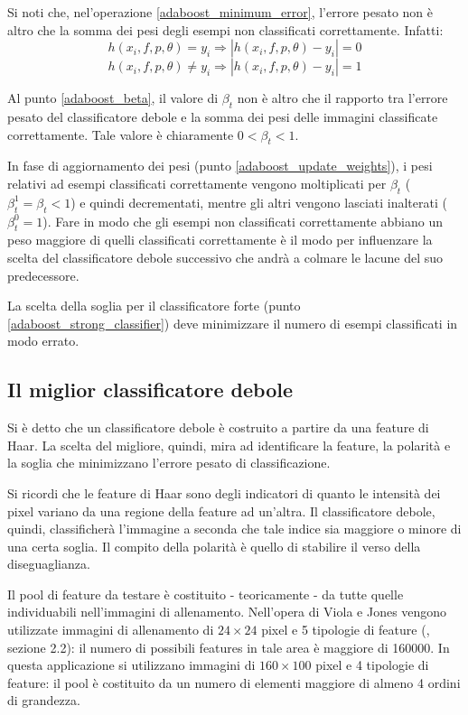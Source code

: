 \documentclass[a4paper,11pt,oneside]{article}
\begin{document}
			Si noti che, nel'operazione \ref{adaboost_minimum_error}, l'errore pesato non è altro che la somma dei pesi degli esempi non classificati correttamente. Infatti:
			$$ h(x_i, f, p, \theta) = y_i \Rightarrow |h(x_i, f, p, \theta) - y_i| = 0 $$
			$$ h(x_i, f, p, \theta) \neq y_i \Rightarrow |h(x_i, f, p, \theta) - y_i| = 1 $$

			Al punto \ref{adaboost_beta}, il valore di $\beta_t$ non è altro che il rapporto tra l'errore pesato del classificatore debole e la somma dei pesi delle immagini classificate correttamente. Tale valore è chiaramente $0 < \beta_t < 1$.

			In fase di aggiornamento dei pesi (punto \ref{adaboost_update_weights}), i pesi relativi ad esempi classificati correttamente vengono moltiplicati per $\beta_t$ ($\beta_{t}^{1} = \beta_t < 1$) e quindi decrementati, mentre gli altri vengono lasciati inalterati ($\beta_{t}^{0} = 1$). Fare in modo che gli esempi non classificati correttamente abbiano un peso maggiore di quelli classificati correttamente è il modo per influenzare la scelta del classificatore debole successivo che andrà a colmare le lacune del suo predecessore.

			La scelta della soglia per il classificatore forte (punto \ref{adaboost_strong_classifier}) deve minimizzare il numero di esempi classificati in modo errato.


		\subsection{Il miglior classificatore debole} %
		\label{sub:il_miglior_classificatore_debole}
			Si è detto che un classificatore debole è costruito a partire da una feature di Haar. La scelta del migliore, quindi, mira ad identificare la feature, la polarità e la soglia che minimizzano l'errore pesato di classificazione.

			Si ricordi che le feature di Haar sono degli indicatori di quanto le intensità dei pixel variano da una regione della feature ad un'altra. Il classificatore debole, quindi, classificherà l'immagine a seconda che tale indice sia maggiore o minore di una certa soglia. Il compito della polarità è quello di stabilire il verso della diseguaglianza.

			Il pool di feature da testare è costituito - teoricamente - da tutte quelle individuabili nell'immagini di allenamento. Nell'opera di Viola e Jones vengono utilizzate immagini di allenamento di $24 \times 24$ pixel e 5 tipologie di feature (\cite{ViolaJones}, sezione 2.2): il numero di possibili features in tale area è maggiore di 160000. In questa applicazione si utilizzano immagini di $160 \times 100$ pixel e 4 tipologie di feature: il pool è costituito da un numero di elementi maggiore di almeno 4 ordini di grandezza.
\end{document}
